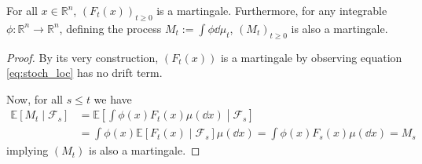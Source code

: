 \begin{proposition}
  For all \(x \in \mathbb{R}^n\), \((F_t(x))_{t \ge 0}\) is a martingale. Furthermore, for any 
  integrable \(\phi : \mathbb{R}^n \to \mathbb{R}^n\), defining the process 
  \(M_t := \int \phi \dd \mu_t\), \((M_t)_{t \ge 0}\) is also a martingale.
\end{proposition}
\begin{proof}
  By its very construction, \((F_t(x))\) is a martingale by observing equation \ref{eq:stoch_loc} has no 
  drift term.
  
  Now, for all \(s \le t\) we have
  \begin{align*}
    \mathbb{E}[M_t \mid \mathscr{F}_s] 
    & = \mathbb{E}\left[\int \phi(x) F_t(x) \mu(\dd x) \middle\vert \mathscr{F}_s\right]\\
    & = \int \phi(x) \mathbb{E}[F_t(x) \mid \mathscr{F}_s] \mu(\dd x) 
    = \int \phi(x) F_s(x) \mu(\dd x)
    = M_s
  \end{align*}
  implying \((M_t)\) is also a martingale.
\end{proof}


